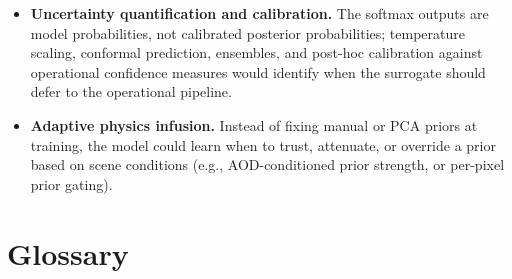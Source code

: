 \documentclass[11pt]{report}
\begin{document}
\begin{itemize}
$$  \item \textbf{Uncertainty quantification and calibration.} The softmax outputs are model probabilities, not calibrated posterior probabilities; temperature scaling, conformal prediction, ensembles, and post-hoc calibration against operational confidence measures would identify when the surrogate should defer to the operational pipeline.
  \item \textbf{Adaptive physics infusion.} Instead of fixing manual or PCA priors at training, the model could learn when to trust, attenuate, or override a prior based on scene conditions (e.g., AOD-conditioned prior strength, or per-pixel prior gating).
\end{itemize}

\chapter*{Glossary}
\end{document}
